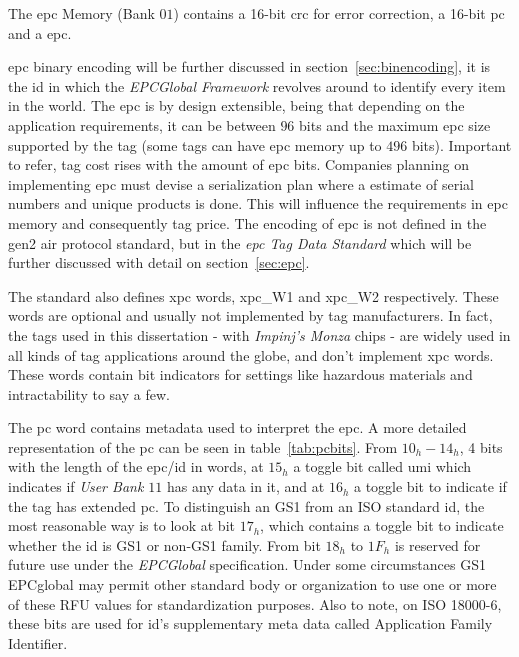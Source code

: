 The \ac{epc} Memory (Bank $01$) contains a 16-bit \ac{crc} for error correction, a 16-bit \ac{pc} and a \ac{epc}.

\ac{epc} binary encoding will be further discussed in section~\ref{sec:binencoding}, it is the \ac{id} in which the \emph{EPCGlobal Framework} revolves around to identify every item in the world. The \ac{epc} is by design extensible, being that depending on the application requirements, it can be between $96$ bits and the maximum \ac{epc} size supported by the tag (some tags can have \ac{epc} memory up to $496$ bits). Important to refer, tag cost rises with the amount of \ac{epc} bits. Companies planning on implementing \ac{epc} must devise a serialization plan where a estimate of serial numbers and unique products is done. This will influence the requirements in \ac{epc} memory and consequently tag price.
The encoding of \ac{epc} is not defined in the \ac{gen2} air protocol standard, but in the \emph{\ac{epc} Tag Data Standard} which will be further discussed with detail on section~\ref{sec:epc}.

The standard also defines \ac{xpc} words, \acs{xpc}\_W1 and \acs{xpc}\_W2 respectively. These words are optional and usually not implemented by tag manufacturers. In fact, the tags used in this dissertation - with \textit{Impinj's Monza} chips - are widely used in all kinds of tag applications around the globe, and don't implement \ac{xpc} words. These words contain bit indicators for settings like hazardous materials and intractability to say a few.

The \ac{pc} word contains metadata used to interpret the \ac{epc}. A more detailed representation of the \ac{pc} can be seen in table~\ref{tab:pcbits}.
From $10_h-14_h$, 4 bits with the length of the \ac{epc}/\ac{id} in words, at $15_h$ a toggle bit called \ac{umi} which indicates if \emph{User Bank $11$} has any data in it, and at $16_h$ a toggle bit to indicate if the tag has extended \ac{pc}.
To distinguish an GS1 from an ISO standard \ac{id}, the most reasonable way is to look at bit $17_h$, which contains a toggle bit to indicate whether the \ac{id} is GS1 or non-GS1 family.
From bit $18_h$ to $1F_h$ is reserved for future use under the \emph{EPCGlobal} specification. Under some circumstances GS1 EPCglobal may permit other standard body or organization to use one or more of these RFU values for standardization purposes. Also to note, on ISO 18000-6, these bits are used for \ac{id}'s supplementary meta data called Application Family Identifier.

